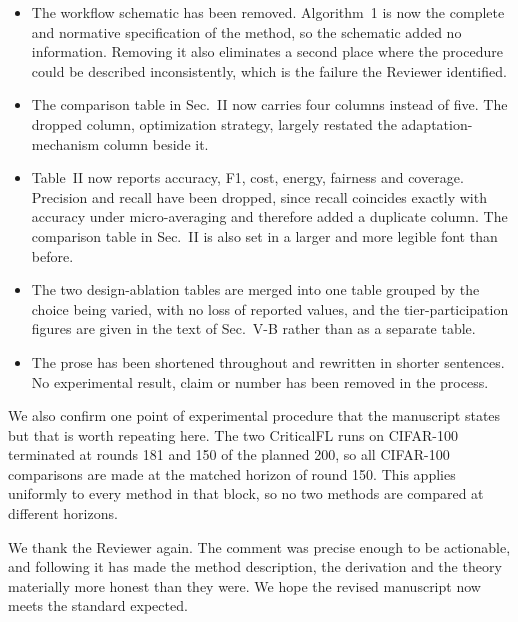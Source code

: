\documentclass[10pt]{article}
\begin{document}
\begin{itemize}[leftmargin=1.6em,itemsep=0.2em]
\item The workflow schematic has been removed. Algorithm~1 is now the complete and normative specification of the method, so the schematic added no information. Removing it also eliminates a second place where the procedure could be described inconsistently, which is the failure the Reviewer identified.
\item The comparison table in Sec.~II now carries four columns instead of five. The dropped column, optimization strategy, largely restated the adaptation-mechanism column beside it.
\item Table~II now reports accuracy, F1, cost, energy, fairness and coverage. Precision and recall have been dropped, since recall coincides exactly with accuracy under micro-averaging and therefore added a duplicate column. The comparison table in Sec.~II is also set in a larger and more legible font than before.
\item The two design-ablation tables are merged into one table grouped by the choice being varied, with no loss of reported values, and the tier-participation figures are given in the text of Sec.~V-B rather than as a separate table.
\item The prose has been shortened throughout and rewritten in shorter sentences. No experimental result, claim or number has been removed in the process.
\end{itemize}

\vspace{0.5em}
We also confirm one point of experimental procedure that the manuscript states but that is worth repeating here. The two CriticalFL runs on CIFAR-100 terminated at rounds 181 and 150 of the planned 200, so all CIFAR-100 comparisons are made at the matched horizon of round 150. This applies uniformly to every method in that block, so no two methods are compared at different horizons.

\vspace{1em}
We thank the Reviewer again. The comment was precise enough to be actionable, and following it has made the method description, the derivation and the theory materially more honest than they were. We hope the revised manuscript now meets the standard expected.
\end{document}
